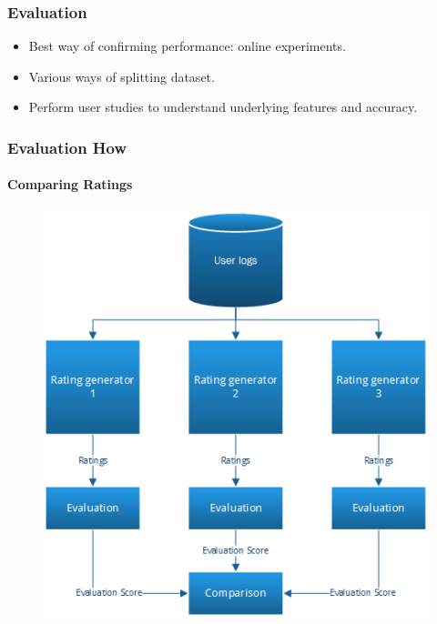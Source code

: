\documentclass{beamer}
\begin{document}
  \begin{frame}
    \frametitle{Evaluation}
    \begin{itemize}
      \item Best way of confirming performance: online experiments.
      \item Various ways of splitting dataset.
      \item Perform user studies to understand underlying features and
      accuracy.
    \end{itemize}
  \end{frame}

  \begin{frame}
    \frametitle{Evaluation How}
    \framesubtitle{Comparing Ratings}
    \begin{figure}[H]
        \includegraphics[scale=0.4]{../src/image/ratinggeneval.png}
        \centering
    \end{figure}
  \end{frame}
\end{document}
